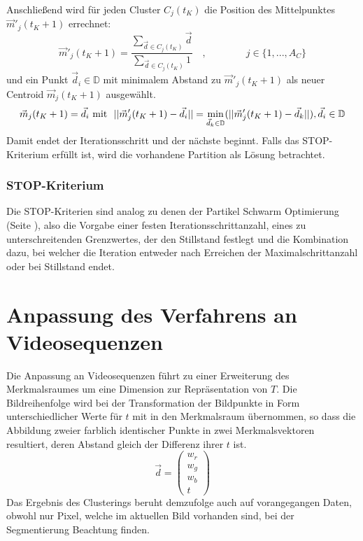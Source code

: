   \noindent Anschließend wird für jeden Cluster $C_j(t_K)$ die Position des Mittelpunktes $\vec{m}'_j(t_K+1)$ errechnet:
  \begin{equation}
    \vec{m}'_j(t_K+1) = \frac{\sum\limits_{\vec{d}\in C_j(t_K)} \vec{d}}{\sum\limits_{\vec{d}\in C_j(t_K)}1} \quad, \qquad\qquad j\in\{1, ..., A_C\}
  \end{equation}
  und ein Punkt $\vec{d}_i\in\mathbb{D}$ mit minimalem Abstand zu $\vec{m}'_j(t_K+1)$ als neuer Centroid $\vec{m}_j(t_K+1)$ ausgewählt.
  \begin{equation}\label{DefKMeans_NeuerCentroid}
    \vec{m}_j(t_K+1) = \vec{d}_i \textrm{\space mit \space}  ||\vec{m}'_j(t_K+1) - \vec{d}_i|| = \min_{\vec{d}_k\in\mathbb{D}}(||\vec{m}'_j(t_K+1)-\vec{d}_k||), \vec{d}_i\in\mathbb{D}
  \end{equation}
  Damit endet der Iterationsschritt und der nächste beginnt. Falls das STOP-Kriterium erfüllt ist, wird die vorhandene Partition als Lösung betrachtet.
   
  
\subsubsection{STOP-Kriterium}
  Die STOP-Kriterien sind analog zu denen der Partikel Schwarm Optimierung (Seite \pageref{PSO_IterStop}), also die Vorgabe einer festen Iterationsschrittanzahl, eines zu unterschreitenden Grenzwertes, der den Stillstand festlegt und die Kombination dazu, bei welcher die Iteration entweder nach Erreichen der Maximalschrittanzahl oder bei Stillstand endet.

\section{Anpassung des Verfahrens an Videosequenzen}
  Die Anpassung an Videosequenzen führt zu einer Erweiterung des Merkmalsraumes um eine Dimension zur Repräsentation von $T$.  
  Die Bildreihenfolge wird bei der Transformation der Bildpunkte in Form unterschiedlicher Werte für $t$ mit in den Merkmalsraum übernommen, so dass die Abbildung zweier farblich identischer Punkte in zwei Merkmalsvektoren resultiert, deren Abstand gleich der Differenz ihrer $t$ ist. 
  \begin{equation}
    \vec{d}=\left(\begin{array}{l} w_r\\ w_g\\ w_b\\ t \end{array}\right)
  \end{equation}
  Das Ergebnis des Clusterings beruht demzufolge auch auf vorangegangen Daten, obwohl nur Pixel, welche im aktuellen Bild vorhanden sind, bei der Segmentierung Beachtung finden.


